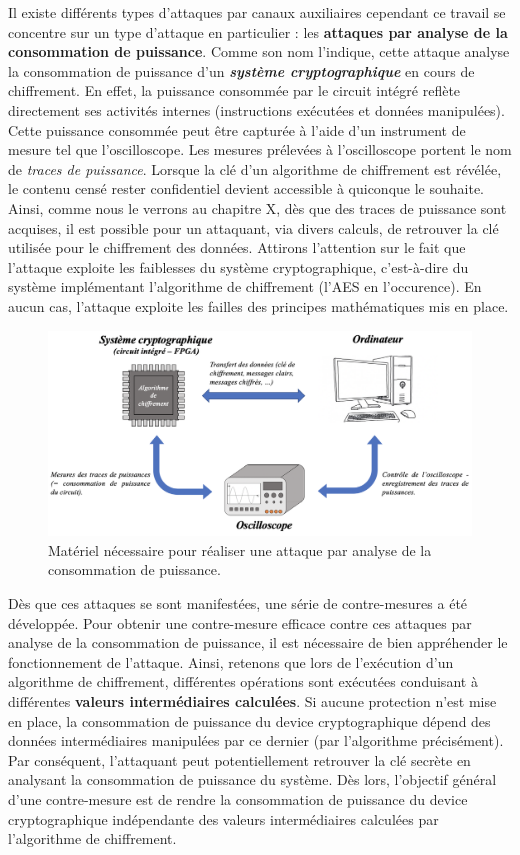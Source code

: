 \documentclass[oneside]{book}
\begin{document}
\newpage
Il existe différents types d'attaques par canaux auxiliaires cependant ce travail se concentre sur un type d'attaque en particulier : les \textbf{attaques par analyse de la consommation de puissance}. Comme son nom l'indique, cette attaque analyse la consommation de puissance d'un \textbf{\textit{système cryptographique}} en cours de chiffrement. En effet, la puissance consommée par le circuit intégré reflète directement ses activités internes (instructions exécutées et données manipulées). Cette puissance consommée peut être capturée à l'aide d'un instrument de mesure tel que l'oscilloscope. Les mesures prélevées à l'oscilloscope portent le nom de \textit{traces de puissance}. Lorsque la clé d'un algorithme de chiffrement est révélée, le contenu censé rester confidentiel devient accessible à quiconque le souhaite. Ainsi, comme nous le verrons au chapitre X, dès que des traces de puissance sont acquises, il est possible pour un attaquant, via divers calculs, de retrouver la clé utilisée pour le chiffrement des données. Attirons l'attention sur le fait que l'attaque exploite les faiblesses du système cryptographique, c'est-à-dire du système implémentant l'algorithme de chiffrement (l'AES en l'occurence). En aucun cas, l'attaque exploite les failles des principes mathématiques mis en place.

\begin{figure}[h]
    \hspace{-1.55cm}
    \includegraphics[scale=0.72]{image/intro.png}
    \caption{Matériel nécessaire pour réaliser une attaque par analyse de la consommation de puissance.}
    \label{fig:intro}
\end{figure}

Dès que ces attaques se sont manifestées, une série de contre-mesures a été développée. Pour obtenir une contre-mesure efficace contre ces attaques par analyse de la consommation de puissance, il est nécessaire de bien appréhender le fonctionnement de l'attaque. Ainsi, retenons que lors de l’exécution d’un algorithme de chiffrement, différentes opérations sont exécutées conduisant à différentes \textbf{valeurs intermédiaires calculées}. Si aucune protection n’est mise en place, la consommation de puissance du device cryptographique dépend des données intermédiaires manipulées par ce dernier (par l’algorithme précisément). Par conséquent, l’attaquant peut potentiellement retrouver la clé secrète en analysant la consommation de puissance du système. Dès lors, l'objectif général d'une contre-mesure est de rendre la consommation de puissance du device cryptographique indépendante des valeurs intermédiaires calculées par l'algorithme de chiffrement. 
\end{document}
